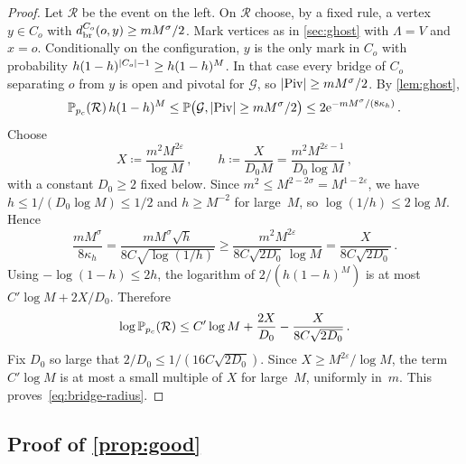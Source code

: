 \begin{proof}
Let $\mathcal R$ be the event on the left. On $\mathcal R$ choose, by a fixed rule, a vertex $y\in C_o$
with $d_{\mathrm{br}}^{C_o}(o,y)\ge mM^\sigma/2$. Mark vertices as in \cref{sec:ghost} with
$\Lambda=V$ and $x=o$. Conditionally on the configuration, $y$ is the only mark in $C_o$ with
probability $h(1-h)^{\lvert C_o\rvert-1}\ge h(1-h)^M$. In that case every bridge of $C_o$ separating $o$ from $y$
is open and pivotal for $\mathcal G$, so $\lvert\operatorname{Piv}\rvert\ge mM^\sigma/2$. By \cref{lem:ghost},
\begin{equation*}
  \mathbb P_{p_c}(\mathcal R)\,h(1-h)^M\le\mathbb P\bigl(\mathcal G,\lvert\operatorname{Piv}\rvert\ge mM^\sigma/2\bigr)
  \le2\mathrm{e}^{-mM^\sigma/(8\kappa_h)}\,.
\end{equation*}
Choose
\begin{equation*}
  X\coloneqq\frac{m^2M^{2\varepsilon}}{\log M}\,,\qquad h\coloneqq\frac{X}{D_0M}=\frac{m^2M^{2\varepsilon-1}}{D_0\log M}\,,
\end{equation*}
with a constant $D_0\ge2$ fixed below. Since $m^2\le M^{2-2\sigma}=M^{1-2\varepsilon}$, we have
$h\le1/(D_0\log M)\le1/2$ and $h\ge M^{-2}$ for large~$M$, so $\log(1/h)\le2\log M$. Hence
\begin{equation*}
  \frac{mM^\sigma}{8\kappa_h}=\frac{mM^\sigma\sqrt h}{8C\sqrt{\log(1/h)}}
  \ge\frac{m^2M^{2\varepsilon}}{8C\sqrt{2D_0}\,\log M}=\frac{X}{8C\sqrt{2D_0}}\,.
\end{equation*}
Using $-\log(1-h)\le2h$, the logarithm of $2/(h(1-h)^M)$ is at most $C'\log M+2X/D_0$. Therefore
\begin{equation*}
  \log\mathbb P_{p_c}(\mathcal R)\le C'\log M+\frac{2X}{D_0}-\frac{X}{8C\sqrt{2D_0}}\,.
\end{equation*}
Fix $D_0$ so large that $2/D_0\le1/(16C\sqrt{2D_0})$. Since $X\ge M^{2\varepsilon}/\log M$, the term
$C'\log M$ is at most a small multiple of $X$ for large~$M$, uniformly in~$m$. This
proves~\eqref{eq:bridge-radius}.
\end{proof}

\subsection{Proof of \texorpdfstring{\cref{prop:good}}{Proposition 3.4}}\label{sec:proof-good}

